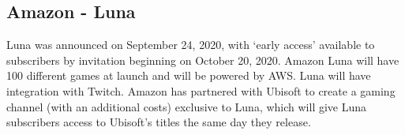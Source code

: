 \subsection{Amazon - Luna}
Luna was announced on September 24, 2020, with ‘early access’ available to subscribers by invitation beginning on October 20, 2020. Amazon Luna will have 100 different games at launch and will be powered by AWS. Luna will have integration with Twitch. Amazon has partnered with Ubisoft to create a gaming channel (with an additional costs) exclusive to Luna, which will give Luna subscribers access to Ubisoft's titles the same day they release\cite{Amazon_Luna}.
